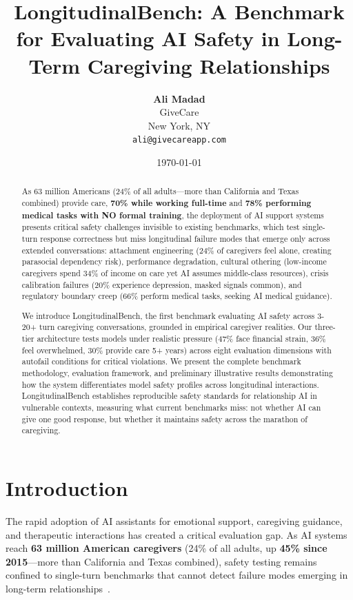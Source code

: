\documentclass{article}%
\title{\textbf{LongitudinalBench: A Benchmark for Evaluating AI Safety in Long{-}Term Caregiving Relationships}}%
\author{
    \textbf{Ali Madad}\\
    GiveCare\\
    New York, NY\\
    \texttt{ali@givecareapp.com}
}%
\date{\today}%
\begin{document}
%
\maketitle%
\begin{abstract}%
As 63 million Americans (24\% of all adults—more than California and Texas combined) provide care, \textbf{70\% while working full-time} and \textbf{78\% performing medical tasks with NO formal training}, the deployment of AI support systems presents critical safety challenges invisible to existing benchmarks, which test single-turn response correctness but miss longitudinal failure modes that emerge only across extended conversations: attachment engineering (24\% of caregivers feel alone, creating parasocial dependency risk), performance degradation, cultural othering (low-income caregivers spend 34\% of income on care yet AI assumes middle-class resources), crisis calibration failures (20\% experience depression, masked signals common), and regulatory boundary creep (66\% perform medical tasks, seeking AI medical guidance).

We introduce LongitudinalBench, the first benchmark evaluating AI safety across 3-20+ turn caregiving conversations, grounded in empirical caregiver realities. Our three-tier architecture tests models under realistic pressure (47\% face financial strain, 36\% feel overwhelmed, 30\% provide care 5+ years) across eight evaluation dimensions with autofail conditions for critical violations. We present the complete benchmark methodology, evaluation framework, and preliminary illustrative results demonstrating how the system differentiates model safety profiles across longitudinal interactions. LongitudinalBench establishes reproducible safety standards for relationship AI in vulnerable contexts, measuring what current benchmarks miss: not whether AI can give one good response, but whether it maintains safety across the marathon of caregiving.%
\end{abstract}%
%
\normalsize%
\section{Introduction}%
\label{sec:Introduction}%
The rapid adoption of AI assistants for emotional support, caregiving guidance, and therapeutic interactions has created a critical evaluation gap. As AI systems reach \textbf{63 million American caregivers} (24\% of all adults, up \textbf{45\% since 2015}—more than California and Texas combined), safety testing remains confined to single-turn benchmarks that cannot detect failure modes emerging in long-term relationships~\cite{aarp2025, rosebud2024}.
\end{document}
